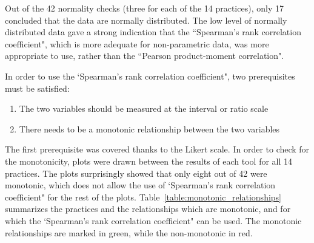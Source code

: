 Out of the 42 normality checks (three for each of the 14 practices), only 17 concluded that the data are normally distributed. The low level of normally distributed data gave a strong indication that the ``Spearman’s rank correlation coefficient", which is more adequate for non-parametric data, was more appropriate to use, rather than the ``Pearson product-moment correlation".

In order to use the `Spearman’s rank correlation coefficient", two prerequisites must be satisfied:
\begin{enumerate}
\item The two variables should be measured at the interval or ratio scale
\item There needs to be a monotonic relationship between the two variables
\end{enumerate}

The first prerequisite was covered thanks to the Likert scale. In order to check for the monotonicity, plots were drawn between the results of each tool for all 14 practices. The plots surprisingly showed that only eight out of 42 were monotonic, which does not allow the use of `Spearman’s rank correlation coefficient" for the rest of the plots. Table~\ref{table:monotonic_relationships} summarizes the practices and the relationships which are monotonic, and for which the `Spearman’s rank correlation coefficient" can be used. The monotonic relationships are marked in green, while the non-monotonic in red.

\newenvironment{mntnc_itemize} 
{ 
	\begin{itemize}
    \setlength{\itemsep}{0pt}  
    \setlength{\parskip}{0pt}  
}
{ \end{itemize}  }

